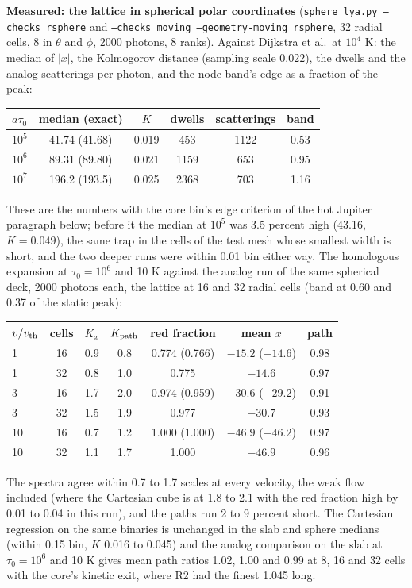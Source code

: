 \documentclass[11pt]{article}
\begin{document}
\textbf{Measured: the lattice in spherical polar coordinates} (\texttt{sphere\_lya.py
--checks rsphere} and \texttt{--checks moving --geometry-moving rsphere}, 32 radial
cells, 8 in $\theta$ and $\phi$, 2000 photons, 8 ranks).  Against Dijkstra et al.\ at
$10^4$ K: the median of $|x|$, the Kolmogorov distance (sampling scale 0.022), the
dwells and the analog scatterings per photon, and the node band's edge as a fraction
of the peak:
\begin{center}
\begin{tabular}{lccccc}
$a\tau_0$ & median (exact) & $K$ & dwells & scatterings & band \\
\hline
$10^5$ & 41.74 (41.68) & 0.019 & 453 & 1122 & 0.53 \\
$10^6$ & 89.31 (89.80) & 0.021 & 1159 & 653 & 0.95 \\
$10^7$ & 196.2 (193.5) & 0.025 & 2368 & 703 & 1.16 \\
\end{tabular}
\end{center}
These are the numbers with the core bin's edge criterion of the hot Jupiter paragraph
below; before it the median at $10^5$ was 3.5 percent high (43.16, $K = 0.049$), the
same trap in the cells of the test mesh whose smallest width is short, and the two
deeper runs were within 0.01 bin either way.  The homologous expansion at $\tau_0 = 10^6$
and 10 K against the analog run of the same spherical deck, 2000 photons each, the
lattice at 16 and 32 radial cells (band at 0.60 and 0.37 of the static peak):
\begin{center}
\begin{tabular}{lcccccc}
$v/v_{\rm th}$ & cells & $K_x$ & $K_{\rm path}$ & red fraction & mean $x$ & path \\
\hline
1 & 16 & 0.9 & 0.8 & 0.774 (0.766) & $-15.2$ ($-14.6$) & 0.98 \\
1 & 32 & 0.8 & 1.0 & 0.775 & $-14.6$ & 0.97 \\
3 & 16 & 1.7 & 2.0 & 0.974 (0.959) & $-30.6$ ($-29.2$) & 0.91 \\
3 & 32 & 1.5 & 1.9 & 0.977 & $-30.7$ & 0.93 \\
10 & 16 & 0.7 & 1.2 & 1.000 (1.000) & $-46.9$ ($-46.2$) & 0.97 \\
10 & 32 & 1.1 & 1.7 & 1.000 & $-46.9$ & 0.96 \\
\end{tabular}
\end{center}
The spectra agree within 0.7 to 1.7 scales at every velocity, the weak flow included
(where the Cartesian cube is at 1.8 to 2.1 with the red fraction high by 0.01 to 0.04
in this run), and the paths run 2 to 9 percent short.  The Cartesian regression on
the same binaries is unchanged in the slab and sphere medians (within 0.15 bin, $K$
0.016 to 0.045) and the analog comparison on the slab at $\tau_0 = 10^6$ and 10 K
gives mean path ratios 1.02, 1.00 and 0.99 at 8, 16 and 32 cells with the core's
kinetic exit, where R2 had the finest 1.045 long.
\end{document}
